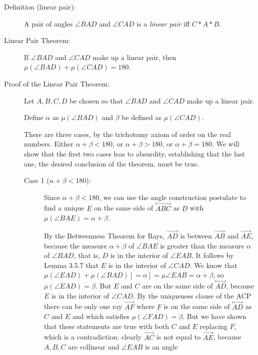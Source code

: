 \documentclass[12pt]{article}
\newcommand\Line[1]{\overset{\leftrightarrow}{#1}}
\begin{document}
\begin{description}

\item[Definition (linear pair):]  A pair of angles $\angle{BAD}$ and $\angle{CAD}$ is a {\em linear pair\/} iff $C*A*B$.

\item[Linear Pair Theorem:]  If $\angle{BAD}$ and $\angle{CAD}$ make up a linear pair, then $\mu(\angle{BAD}) + \mu(\angle{CAD})= 180$.

\item[Proof of the Linear Pair Theorem:]  Let $A,B,C,D$ be chosen so that $\angle{BAD}$ and $\angle{CAD}$ make up a linear pair.

Define $\alpha$ as $\mu(\angle{BAD})$ and $\beta$ be defined as $\mu(\angle{CAD})$.       

There are three cases, by the trichotomy axiom of order on the real numbers.  Either $\alpha+\beta<180$, or $\alpha+\beta>180$, or $\alpha+\beta=180$.  We will show that the first two cases leas to absurdity, establishing that the last one, the desired conclusion of the theorem, must be true.

\begin{description}

\item[Case 1 ($\alpha+\beta<180$):]  Since $\alpha+\beta<180$, we can use the angle construction postulate to find a unique $E$ on the same side of $\Line{ABC}$ as $D$ with
$\mu(\angle{BAE})=\alpha+\beta$.

By the Betweenness Theorem for Rays, $\overrightarrow{AD}$ is between $\overrightarrow{AB}$ and $\overrightarrow{AE}$, because the measure $\alpha+\beta$ of $\angle BAE$ is greater than the measure $\alpha$ of $\angle BAD$, that is, $D$ is in the interior of $\angle EAB$.  It follows by Lemma 3.5.7 that $E$ is in the interior of $\angle CAD$.   We know that $\mu(\angle {EAD}) + \mu(\angle {BAD}) [=\alpha] = \mu{\angle EAB} = \alpha+\beta$, so $\mu(\angle {EAD}) = \beta$.  But $E$  and $C$ are on the same side of $\Line{AD}$, because $E$ is in the interior of $\angle CAD$.  By the uniqueness clause of the ACP there can be only one ray $\overrightarrow{AF}$ where $F$ is on the same side of $\Line{AD}$ as $C$ and $E$ and which satisfies $\mu(\angle FAD)=\beta$.  But we have shown that these statements are true with both $C$ and $E$ replacing $F$, which is a contradiction:  clearly $\overrightarrow{AC}$ is not equal to $\overrightarrow{AE}$, because $A,B,C$ are collinear and $\angle EAB$ is an angle


\end{description}
\end{description}
\end{document}
